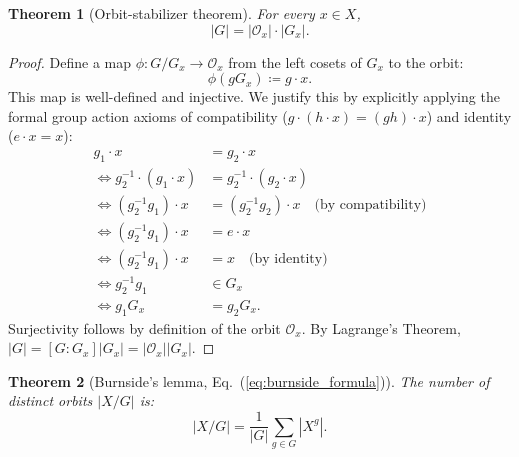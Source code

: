 \documentclass[11pt, letterpaper]{article}
\newtheorem{theorem}{Theorem}[section]
\begin{document}
\begin{theorem}[Orbit-stabilizer theorem]
For every $x \in X$,
\begin{equation}
    |G| = |\mathcal{O}_x| \cdot |G_x|.
\end{equation}
\end{theorem}

\begin{proof}
Define a map $\phi: G/G_x \to \mathcal{O}_x$ from the left cosets of $G_x$ to the orbit:
\begin{equation}
    \phi(g G_x) \coloneqq g \cdot x.
\end{equation}
This map is well-defined and injective. We justify this by explicitly applying the formal group action axioms of compatibility ($g \cdot (h \cdot x) = (gh) \cdot x$) and identity ($e \cdot x = x$):
\begin{align*}
    g_1 \cdot x &= g_2 \cdot x \\
    \iff g_2^{-1} \cdot (g_1 \cdot x) &= g_2^{-1} \cdot (g_2 \cdot x) \\
    \iff (g_2^{-1} g_1) \cdot x &= (g_2^{-1} g_2) \cdot x \quad \text{(by compatibility)} \\
    \iff (g_2^{-1} g_1) \cdot x &= e \cdot x \\
    \iff (g_2^{-1} g_1) \cdot x &= x \quad \text{(by identity)} \\
    \iff g_2^{-1} g_1 &\in G_x \\
    \iff g_1 G_x &= g_2 G_x.
\end{align*}
Surjectivity follows by definition of the orbit $\mathcal{O}_x$. By Lagrange's Theorem, $|G| = [G : G_x] |G_x| = |\mathcal{O}_x| |G_x|$.
\end{proof}

\begin{theorem}[Burnside's lemma, Eq.~(\ref{eq:burnside_formula})]
The number of distinct orbits $|X/G|$ is:
\begin{equation}
    |X/G| = \frac{1}{|G|} \sum_{g \in G} |X^g|.
\end{equation}
\end{theorem}
\end{document}
